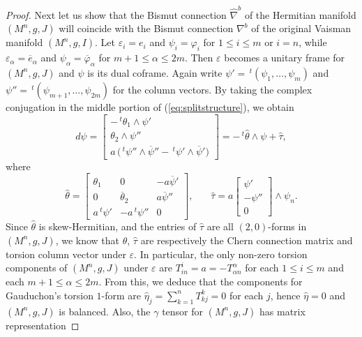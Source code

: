 \documentclass{amsart}
\numberwithin{equation}{section}
\theoremstyle{definition}
\renewcommand{\1}{\mathds{1}}
\renewcommand{\>}{\rightarrow}
\begin{document}
\begin{proof}
Next let us show that the Bismut connection $\hat{\nabla}^b$ of the Hermitian manifold $(M^n,g,J)$ will coincide with the Bismut connection $\nabla^b$ of the original Vaisman manifold $(M^n,g,I)$. Let $\varepsilon_i=e_i$ and $\psi_i =\varphi_i$ for $1\leq i\leq m$ or $i=n$, while $\varepsilon_{\alpha}=\overline{e}_{\alpha}$ and $\psi_{\alpha}=\overline{\varphi}_{\alpha}$ for $m\!+\!1\leq \alpha \leq 2m$. Then $\varepsilon$ becomes a unitary frame for $(M^n,g,J)$ and $\psi$ is its dual coframe. Again write $\psi'=\,^t\!(\psi_1, \ldots , \psi_m)$ and  $\psi''=\,^t\!(\psi_{m\!+\!1}, \ldots , \psi_{2m})$  for the column vectors. By taking the complex conjugation in the middle portion of (\ref{eq:splitstructure}), we obtain
\begin{equation} \label{eq:splitstructure2}
 d\psi =  \left[ \begin{array}{c} -\,^t\!\theta_1 \wedge \psi'   \\  \theta_2\wedge \psi'' \\ a\,\big( \,^t\!\psi'' \wedge \overline{\psi}'' - \,^t\!\psi' \wedge \overline{\psi}'  \big)  \end{array} \right] =-\,^t\!\hat{\theta}\wedge \psi +\hat{\tau},
\end{equation}
where
$$ \hat{\theta} = \left[ \begin{array}{ccc}  \theta_1 & 0 & -a\overline{\psi}'   \\
0 & \overline{\theta}_2 &  a\overline{\psi}'' \\ a\,^t\!\psi'  & -a\,^t\!\psi''  & 0 \end{array} \right]  ,
\ \ \ \ \ \ \ \ \hat{\tau}=a\left[ \begin{array}{c}  \psi'   \\   -\psi'' \\ 0  \end{array} \right] \wedge \psi_n.$$
Since $\hat{\theta}$ is skew-Hermitian, and the entries of $\hat{\tau}$ are all $(2,0)$-forms in $(M^n,g,J)$, we know that $\hat{\theta}$, $\hat{\tau}$ are respectively the Chern connection matrix and torsion column vector under $\varepsilon$. In particular, the only non-zero torsion components of $(M^n,g,J)$ under $\varepsilon$ are $T^i_{in}=a=- T^{\alpha}_{\alpha n}$ for each $1\leq i\leq m$ and each $m\!+\!1\leq \alpha \leq 2m$.  From this, we deduce that the components for Gauduchon's torsion $1$-form are $\hat{\eta}_j = \sum_{k=1}^n T^k_{kj}=0$ for each $j$, hence $\hat{\eta}=0$ and $(M^n,g,J)$ is balanced. Also, the $\gamma$ tensor for $(M^n,g,J)$ has matrix representation

\end{proof}
\end{document}
